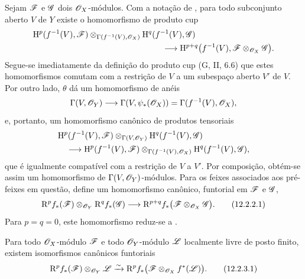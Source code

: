 \begin{env}[12.2.2]
\label{0.12.2.2}
Sejam $\mathscr{F}$ e $\mathscr{G}$ dois $\mathscr{O}_X$-módulos.
Com a notação de , para todo subconjunto aberto $V$ de
$Y$ existe o homomorfismo de produto cup 
\[
  \begin{aligned}
  &\HH^p(f^{-1}(V),\sh{F})
    \otimes_{\Gamma(f^{-1}(V),\sh{O}_X)}
    \HH^q(f^{-1}(V),\sh{G})\\
  &\hspace{55mm}\longrightarrow
    \HH^{p+q}\bigl(f^{-1}(V),
      \sh{F}\otimes_{\sh{O}_X}\sh{G}\bigr).
  \end{aligned}
\]
Segue-se imediatamente da definição do produto cup
(G, II, 6.6) que estes homomorfismos comutam com a restrição de
$V$ a um subespaço aberto $V'$ de $V$.
Por outro lado, $\theta$ dá um homomorfismo de anéis
\[
  \Gamma(V,\mathscr{O}_Y)
  \longrightarrow\Gamma(V,\psi_*(\mathscr{O}_X))
  =\Gamma(f^{-1}(V),\mathscr{O}_X),
\]
e, portanto, um homomorfismo canônico de produtos tensoriais
\[
  \begin{aligned}
  &\mathrm{H}^p(f^{-1}(V),\mathscr{F})
    \otimes_{\Gamma(V,\mathscr{O}_Y)}
    \mathrm{H}^q(f^{-1}(V),\mathscr{G})\\
  &\quad\longrightarrow
    \mathrm{H}^p(f^{-1}(V),\mathscr{F})
    \otimes_{\Gamma(f^{-1}(V),\mathscr{O}_X)}
    \mathrm{H}^q(f^{-1}(V),\mathscr{G}),
  \end{aligned}
\]
que é igualmente compatível com a restrição de $V$ a $V'$.
Por composição, obtém-se assim um homomorfismo de
$\Gamma(V,\mathscr{O}_Y)$-módulos.  Para os feixes associados aos
pré-feixes em questão, define um homomorfismo canônico,
funtorial em $\mathscr{F}$ e $\mathscr{G}$,
\[
  \RR^p f_*(\sh{F})\otimes_{\sh{O}_Y}\RR^q f_*(\sh{G})
  \longrightarrow
  \RR^{p+q}f_*
    \bigl(\sh{F}\otimes_{\sh{O}_X}\sh{G}\bigr).
  \tag{12.2.2.1}
  \label{0.12.2.2.1}
\]
Para $p=q=0$, este homomorfismo reduz-se a
.
\end{env}

\begin{proposition}[12.2.3]
\label{0.12.2.3}
Para todo $\mathscr{O}_X$-módulo $\mathscr{F}$ e todo $\mathscr{O}_Y$-módulo
$\mathscr{L}$ localmente livre de posto finito, existem isomorfismos canônicos
funtoriais
\[
  \RR^p f_*(\sh{F})\otimes_{\sh{O}_Y}\sh{L}
  \simto
  \RR^p f_*
    \bigl(\sh{F}\otimes_{\sh{O}_X}f^*(\sh{L})\bigr).
  \tag{12.2.3.1}
  \label{0.12.2.3.1}
\]
\end{proposition}

